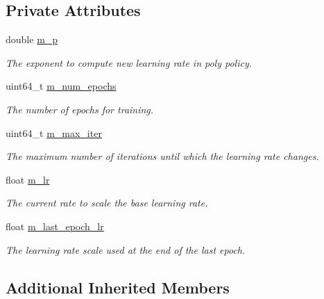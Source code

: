 \subsection*{Private Attributes}
\begin{DoxyCompactItemize}
\item 
double \hyperlink{classlbann_1_1lbann__callback__poly__learning__rate_a03c8c9a738036f9b778f11416112fd80}{m\+\_\+p}
\begin{DoxyCompactList}\small\item\em The exponent to compute new learning rate in poly policy. \end{DoxyCompactList}\item 
uint64\+\_\+t \hyperlink{classlbann_1_1lbann__callback__poly__learning__rate_a493de3bbdea4bed802e663af9b81af8e}{m\+\_\+num\+\_\+epochs}
\begin{DoxyCompactList}\small\item\em The number of epochs for training. \end{DoxyCompactList}\item 
uint64\+\_\+t \hyperlink{classlbann_1_1lbann__callback__poly__learning__rate_a43c06187577baff885bda6177fe56c3f}{m\+\_\+max\+\_\+iter}
\begin{DoxyCompactList}\small\item\em The maximum number of iterations until which the learning rate changes. \end{DoxyCompactList}\item 
float \hyperlink{classlbann_1_1lbann__callback__poly__learning__rate_a02cb265abba03e10fcba2be3cbbafce4}{m\+\_\+lr}
\begin{DoxyCompactList}\small\item\em The current rate to scale the base learning rate. \end{DoxyCompactList}\item 
float \hyperlink{classlbann_1_1lbann__callback__poly__learning__rate_aad95c34cfb705392bf38ecbb0dc97b32}{m\+\_\+last\+\_\+epoch\+\_\+lr}
\begin{DoxyCompactList}\small\item\em The learning rate scale used at the end of the last epoch. \end{DoxyCompactList}\end{DoxyCompactItemize}
\subsection*{Additional Inherited Members}


